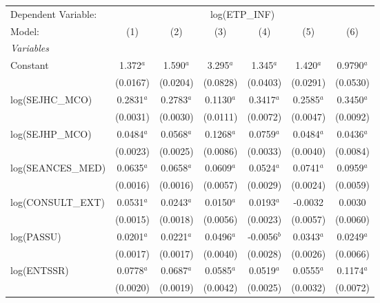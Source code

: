 
\begingroup
\centering
\begin{tabular}{lcccccc}
   \tabularnewline \midrule \midrule
   Dependent Variable: & \multicolumn{6}{c}{log(ETP\_INF)}\\
   Model:              & (1)          & (2)           & (3)          & (4)           & (5)          & (6)\\  
   \midrule
   \emph{Variables}\\
   Constant            & 1.372$^{a}$  & 1.590$^{a}$   & 3.295$^{a}$  & 1.345$^{a}$   & 1.420$^{a}$  & 0.9790$^{a}$\\   
                       & (0.0167)     & (0.0204)      & (0.0828)     & (0.0403)      & (0.0291)     & (0.0530)\\   
   log(SEJHC\_MCO)     & 0.2831$^{a}$ & 0.2783$^{a}$  & 0.1130$^{a}$ & 0.3417$^{a}$  & 0.2585$^{a}$ & 0.3450$^{a}$\\   
                       & (0.0031)     & (0.0030)      & (0.0111)     & (0.0072)      & (0.0047)     & (0.0092)\\   
   log(SEJHP\_MCO)     & 0.0484$^{a}$ & 0.0568$^{a}$  & 0.1268$^{a}$ & 0.0759$^{a}$  & 0.0484$^{a}$ & 0.0436$^{a}$\\   
                       & (0.0023)     & (0.0025)      & (0.0086)     & (0.0033)      & (0.0040)     & (0.0084)\\   
   log(SEANCES\_MED)   & 0.0635$^{a}$ & 0.0658$^{a}$  & 0.0609$^{a}$ & 0.0524$^{a}$  & 0.0741$^{a}$ & 0.0959$^{a}$\\   
                       & (0.0016)     & (0.0016)      & (0.0057)     & (0.0029)      & (0.0024)     & (0.0059)\\   
   log(CONSULT\_EXT)   & 0.0531$^{a}$ & 0.0243$^{a}$  & 0.0150$^{a}$ & 0.0193$^{a}$  & -0.0032      & 0.0030\\   
                       & (0.0015)     & (0.0018)      & (0.0056)     & (0.0023)      & (0.0057)     & (0.0060)\\   
   log(PASSU)          & 0.0201$^{a}$ & 0.0221$^{a}$  & 0.0496$^{a}$ & -0.0056$^{b}$ & 0.0343$^{a}$ & 0.0249$^{a}$\\   
                       & (0.0017)     & (0.0017)      & (0.0040)     & (0.0028)      & (0.0026)     & (0.0066)\\   
   log(ENTSSR)         & 0.0778$^{a}$ & 0.0687$^{a}$  & 0.0585$^{a}$ & 0.0519$^{a}$  & 0.0555$^{a}$ & 0.1174$^{a}$\\   
                       & (0.0020)     & (0.0019)      & (0.0042)     & (0.0025)      & (0.0032)     & (0.0072)\\   

\end{tabular}
